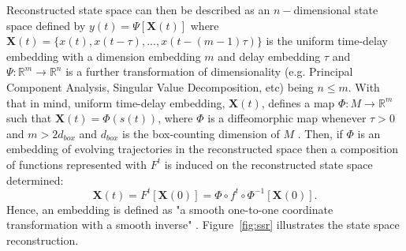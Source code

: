Reconstructed state space can then be described as an $n-$dimensional
 state space defined by $y(t)=\Psi[\boldsymbol{X}(t)]$ where 
$\boldsymbol{X}(t) = \{ x(t), x(t-\tau) , ...,x(t - (m-1)\tau  ) \}$ 
is the uniform time-delay embedding with a dimension embedding $m$
and delay embedding $\tau$ and
$ \Psi: \mathbb{R}^m \rightarrow \mathbb{R}^n$ is a further transformation
of dimensionality (e.g. Principal Component Analysis, Singular Value Decomposition, etc)
being $n \leq m$.
With that in mind, uniform time-delay embedding, $\boldsymbol{X}(t)$, defines a map
$\Phi: M \rightarrow \mathbb{R}^m$ such that $\boldsymbol{X}(t) = \Phi(s(t))$,
where $\Phi$ is a diffeomorphic map \cite{takens1981}
whenever $\tau > 0$ and $m > 2d_{box}$ and $d_{box}$ is the box-counting
dimension of $M$ \cite{garland2016}.
Then, if $\Phi$ is an embedding of evolving trajectories in the reconstructed space 
then a composition of functions represented with $F^t$ is induced on the
reconstructed state space determined:
\begin{equation}\label{eq:st}
  \boldsymbol{X}(t)=F^t [\boldsymbol{X}(0)] = \Phi \circ f^t \circ \Phi ^{-1}[\boldsymbol{X}(0)].
\end{equation}
Hence, an embedding is defined as "a smooth
one-to-one coordinate transformation with a smooth inverse" \cite{casdagli1991}.
Figure~\ref{fig:ssr} illustrates the state space reconstruction.
